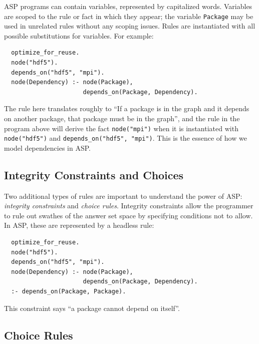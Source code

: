 ASP programs can contain variables, represented by capitalized words. Variables are
scoped to the rule or fact in which they appear; the variable {\tt Package} may be used
in unrelated rules without any scoping issues. Rules are instantiated with all possible
substitutions for variables. For example:
\begin{verbatim}
  optimize_for_reuse.
  node("hdf5").
  depends_on("hdf5", "mpi").
  node(Dependency) :- node(Package),
                      depends_on(Package, Dependency).
\end{verbatim}
The rule here translates roughly to ``If a package is in the graph and it depends on
another package, that package must be in the graph'', and the rule in the program above
will derive the fact {\tt node("mpi")} when it is instantiated with {\tt
  node("hdf5")} and {\tt depends\_on("hdf5", "mpi")}. This is the essence of how
  we model dependencies in ASP.

\subsection{Integrity Constraints and Choices}

Two additional types of rules are important to understand the power of ASP:
\textit{integrity constraints} and \textit{choice rules}.
Integrity constraints allow the programmer to rule out swathes of the answer set space
by specifying conditions not to allow. In ASP, these are represented by a headless rule:
\begin{verbatim}
  optimize_for_reuse.
  node("hdf5").
  depends_on("hdf5", "mpi").
  node(Dependency) :- node(Package),
                      depends_on(Package, Dependency).
  :- depends_on(Package, Package).
\end{verbatim}
This constraint says ``a package cannot depend on itself''.

\subsection{Choice Rules}

